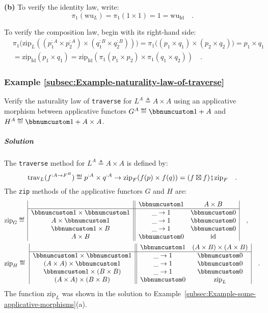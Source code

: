 \textbf{(b)} To verify the identity law, write:
\[
\pi_{1}(\text{wu}_{L})=\pi_{1}(1\times1)=1=\text{wu}_{\text{Id}}\quad.
\]

To verify the composition law, begin with its right-hand side:
\begin{align*}
 & \pi_{1}\big(\text{zip}_{L}((p_{1}^{:A}\times p_{2}^{:A})\times(q_{1}^{:B}\times q_{2}^{:B}))\big)=\pi_{1}\big((p_{1}\times q_{1})\times(p_{2}\times q_{2})\big)=p_{1}\times q_{1}\\
 & =\text{zip}_{\text{Id}}(p_{1}\times q_{1})=\text{zip}_{\text{Id}}(\pi_{1}(p_{1}\times p_{2})\times\pi_{1}(q_{1}\times q_{2}))\quad.
\end{align*}


\subsubsection{Example \label{subsec:Example-naturality-law-of-traverse}\ref{subsec:Example-naturality-law-of-traverse}}

Verify the naturality law of \lstinline!traverse! for $L^{A}\triangleq A\times A$
using an applicative morphism between applicative functors $G^{A}\triangleq\bbnum 1+A$
and $H^{A}\triangleq\bbnum 1+A\times A$. 

\subparagraph{Solution}

The \lstinline!traverse! method for $L^{A}\triangleq A\times A$
is defined by:
\[
\text{trav}_{L}(f^{:A\rightarrow F^{B}})\triangleq p^{:A}\times q^{:A}\rightarrow\text{zip}_{F}(f(p)\times f(q))=(f\boxtimes f)\bef\text{zip}_{F}\quad.
\]
The \lstinline!zip! methods of the applicative functors $G$ and
$H$ are:
\begin{align*}
 & \text{zip}_{G}\triangleq\,\begin{array}{|c||cc|}
 & \bbnum 1 & A\times B\\
\hline \bbnum 1\times\bbnum 1 & \_\rightarrow1 & \bbnum 0\\
A\times\bbnum 1 & \_\rightarrow1 & \bbnum 0\\
\bbnum 1\times B & \_\rightarrow1 & \bbnum 0\\
A\times B & \bbnum 0 & \text{id}
\end{array}\quad,\\
 & \text{zip}_{H}\triangleq\,\,\begin{array}{|c||cc|}
 & \bbnum 1 & (A\times B)\times(A\times B)\\
\hline \bbnum 1\times\bbnum 1 & \_\rightarrow1 & \bbnum 0\\
(A\times A)\times\bbnum 1 & \_\rightarrow1 & \bbnum 0\\
\bbnum 1\times(B\times B) & \_\rightarrow1 & \bbnum 0\\
(A\times A)\times(B\times B) & \bbnum 0 & \text{zip}_{L}
\end{array}\quad.
\end{align*}
The function $\text{zip}_{L}$ was shown in the solution to Example~\ref{subsec:Example-some-applicative-morphisms}(a). 

